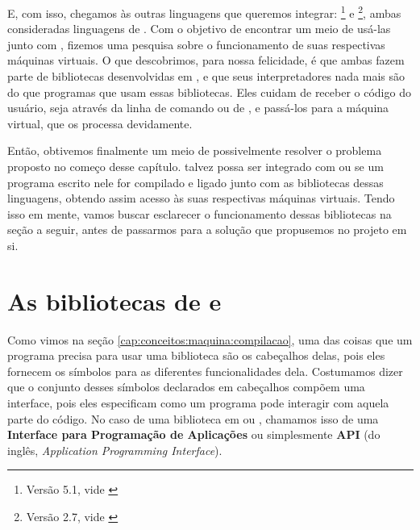     E, com isso, chegamos às outras linguagens que queremos integrar:
    \footnote{Versão 5.1, vide \cite{lua:00}} e
    \footnote{Versão 2.7, vide \cite{python:00}}, ambas
    consideradas linguagens de \script{}. Com o objetivo de encontrar um meio de
    usá-las junto com \CXX{}, fizemos uma pesquisa sobre o funcionamento de suas
    respectivas máquinas virtuais. O que descobrimos, para nossa felicidade, é
    que ambas fazem parte de bibliotecas desenvolvidas em \C{}, e que seus interpretadores
    nada mais são do que programas que usam essas bibliotecas. Eles cuidam de
    receber o código do usuário, seja através da linha de comando ou de
    , e passá-los para a máquina virtual, que os processa devidamente.
    
    Então, obtivemos finalmente um meio de possivelmente resolver o problema
    proposto no começo desse capítulo. \CXX{} talvez possa ser integrado com
     ou  se um programa escrito nele for compilado e
    ligado junto com as bibliotecas dessas linguagens, obtendo assim acesso às
    suas respectivas máquinas virtuais. Tendo isso em mente, vamos buscar
    esclarecer o funcionamento dessas bibliotecas na seção a seguir, antes de
    passarmos para a solução que propusemos no projeto em si.

  \section{As bibliotecas de  e }
  \label{cap:conceitos:apis}

    Como vimos na seção \ref{cap:conceitos:maquina:compilacao}, uma das coisas
    que um programa precisa para usar uma biblioteca são os cabeçalhos delas,
    pois eles fornecem os símbolos para as diferentes funcionalidades dela.
    Costumamos dizer que o conjunto desses símbolos declarados em cabeçalhos
    compõem uma interface, pois eles especificam como um programa pode interagir
    com aquela parte do código. No caso de uma biblioteca em \C{} ou \CXX{},
    chamamos isso de uma \textbf{Interface para Programação de Aplicações} ou
    simplesmente \textbf{API} (do inglês, \textit{Application Programming
    Interface})\footnotemark{}.


